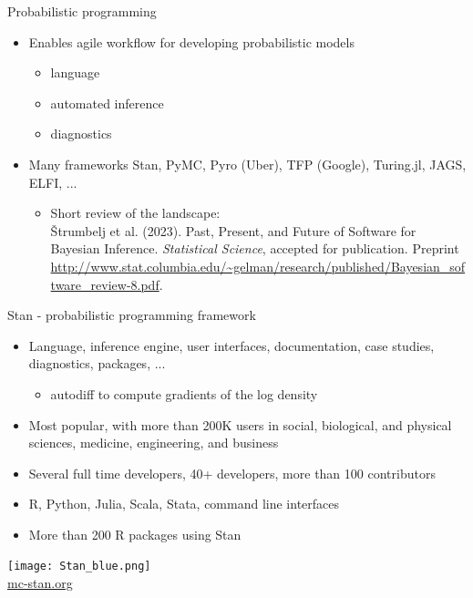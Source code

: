 \documentclass[finnish,english,t]{beamer}
\begin{document}
\begin{frame}{Probabilistic programming}
  
  \begin{itemize}
  \item Enables agile workflow for developing probabilistic models
    \begin{itemize}
    \item language
    \item automated inference
    \item diagnostics
    \end{itemize}
  \item Many frameworks
    Stan, PyMC, Pyro (Uber), TFP (Google), Turing.jl, JAGS, ELFI, ...
    \begin{itemize}
    \item Short review of the landscape:\\
      {\small Štrumbelj et al. (2023). Past, Present, and Future of
        Software for Bayesian Inference. \textit{Statistical Science},
        accepted for publication. Preprint
        \url{http://www.stat.columbia.edu/~gelman/research/published/Bayesian_software_review-8.pdf}}.
      
    \end{itemize}
  \end{itemize}
  
\end{frame}

\begin{frame}{Stan - probabilistic programming framework}

   \begin{itemize}
   \item Language, inference engine, user interfaces, documentation,
     case studies, diagnostics, packages, ...
     \begin{itemize}
     \item autodiff to compute gradients of the log density
     \end{itemize}
   \item<2-> Most popular, with more than 200K users in social, biological, and
     physical sciences, medicine, engineering, and business
     
   \item<3-> Several full time developers, 40+ developers, more than 100 contributors
   \item<4-> R, Python, Julia, Scala, Stata, command line interfaces
    \item<4-> More than 200 R packages using Stan
   \end{itemize}
  \vfill
  \begin{center}
    \texttt{[image: Stan\_blue.png]}\\
    \url{mc-stan.org}
  \end{center}
\end{frame}
\end{document}
